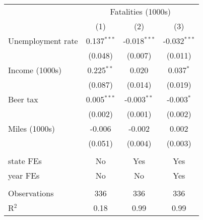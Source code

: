 \begingroup
\centering
\begin{tabular}{lccc}
   \toprule
    & \multicolumn{3}{c}{Fatalities (1000s)}\\
                     & (1)           & (2)            & (3)\\  
   \midrule 
   Unemployment rate & 0.137$^{***}$ & -0.018$^{***}$ & -0.032$^{***}$\\   
                     & (0.048)       & (0.007)        & (0.011)\\   
   Income (1000s)    & 0.225$^{**}$  & 0.020          & 0.037$^{*}$\\   
                     & (0.087)       & (0.014)        & (0.019)\\   
   Beer tax          & 0.005$^{***}$ & -0.003$^{**}$  & -0.003$^{*}$\\   
                     & (0.002)       & (0.001)        & (0.002)\\   
   Miles (1000s)     & -0.006        & -0.002         & 0.002\\   
                     & (0.051)       & (0.004)        & (0.003)\\   
    \\
   state FEs         & No            & Yes            & Yes\\  
   year FEs          & No            & No             & Yes\\  
    \\
   Observations      & 336           & 336            & 336\\  
   R$^2$             & 0.18          & 0.99           & 0.99\\  
   \bottomrule
\end{tabular}
\par\endgroup
